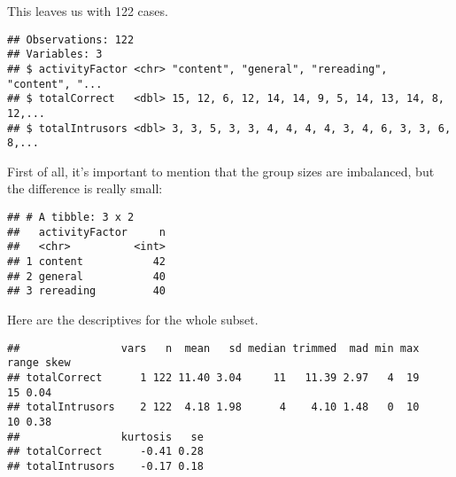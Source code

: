 \documentclass[12pt,]{article}
\newenvironment{Shaded}{\begin{snugshade}}{\end{snugshade}}
\newcommand{\KeywordTok}[1]{\textcolor[rgb]{0.13,0.29,0.53}{\textbf{#1}}}
\newcommand{\NormalTok}[1]{#1}
\newcommand{\OperatorTok}[1]{\textcolor[rgb]{0.81,0.36,0.00}{\textbf{#1}}}
\newcommand{\StringTok}[1]{\textcolor[rgb]{0.31,0.60,0.02}{#1}}
\begin{document}
This leaves us with 122 cases.

\begin{Shaded}
\end{Shaded}

\begin{verbatim}
## Observations: 122
## Variables: 3
## $ activityFactor <chr> "content", "general", "rereading", "content", "...
## $ totalCorrect   <dbl> 15, 12, 6, 12, 14, 14, 9, 5, 14, 13, 14, 8, 12,...
## $ totalIntrusors <dbl> 3, 3, 5, 3, 3, 4, 4, 4, 4, 3, 4, 6, 3, 3, 6, 8,...
\end{verbatim}

First of all, it's important to mention that the group sizes are
imbalanced, but the difference is really small:

\begin{Shaded}
\end{Shaded}

\begin{verbatim}
## # A tibble: 3 x 2
##   activityFactor     n
##   <chr>          <int>
## 1 content           42
## 2 general           40
## 3 rereading         40
\end{verbatim}

Here are the descriptives for the whole subset.

\begin{Shaded}
\end{Shaded}

\begin{verbatim}
##                vars   n  mean   sd median trimmed  mad min max range skew
## totalCorrect      1 122 11.40 3.04     11   11.39 2.97   4  19    15 0.04
## totalIntrusors    2 122  4.18 1.98      4    4.10 1.48   0  10    10 0.38
##                kurtosis   se
## totalCorrect      -0.41 0.28
## totalIntrusors    -0.17 0.18
\end{verbatim}
\end{document}
